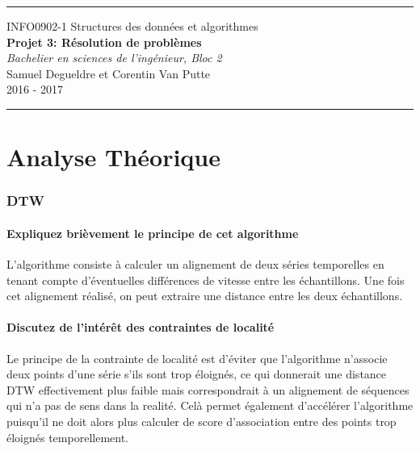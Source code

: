 \documentclass[a4paper,11pt]{article}
\begin{document}
\setcounter{page}{1}


\begin{center}


\rule{\linewidth}{0.3mm}
\LARGE
INFO0902-1 Structures des données et algorithmes\\
\vspace{0.3cm}
\large
\textbf{Projet 3: Résolution de problèmes}\\
\vspace{0.3cm}
\normalsize
\textit{Bachelier en sciences de l'ingénieur, Bloc 2}\\
\vspace{0.2cm}
Samuel Degueldre et Corentin Van Putte\\
\vspace{0.2cm}
2016 - 2017\\
\LARGE
\rule{\linewidth}{0.3mm}
 

\end{center}
\part{Analyse Théorique}


\section{DTW}
\subsection{Expliquez brièvement le principe de cet algorithme}

L’algorithme consiste à calculer un alignement de deux séries temporelles en tenant compte d’éventuelles différences de vitesse entre les échantillons. Une fois cet alignement réalisé, on peut extraire une distance entre les deux échantillons.

\subsection{Discutez de l'intérêt des contraintes de localité}

Le principe de la contrainte de localité est d’éviter que l’algorithme n’associe deux points d’une série s’ils sont trop éloignés, ce qui donnerait une distance DTW effectivement plus faible mais correspondrait à un alignement de séquences qui n’a pas de sens dans la realité. Celà permet également d’accélérer l’algorithme puisqu’il ne doit alors plus calculer de score d’association entre des points trop éloignés temporellement.
\end{document}
